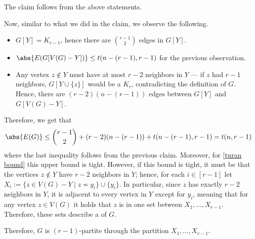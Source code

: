 \documentclass[a4paper, 12pt]{report}
\begin{document}
{{            The claim follows from the above statements.
        }

        Now, similar to what we did in the claim, we observe the following.

        \begin{itemize}
            \item $G[Y] = K_{r - 1}$, hence there are $\binom{r - 1}{2}$ edges in $G[Y]$.
            \item $\abs{E(G[V(G) - Y])} \le t(n - (r - 1), r - 1)$ for the previous observation.
            \item Any vertex $z \notin Y$ must have at most $r - 2$ neighbors in $Y$ --- if $z$ had $r - 1$ neighbors, $G[Y \cup \{z\}]$ would be a $K_r$, contradicting the definition of $G$. Hence, there are $(r - 2)(n - (r - 1))$ edges between $G[Y]$ and $G[V(G) - Y]$.
        \end{itemize}

        Therefore, we get that $$\abs{E(G)} \le \binom{ r- 1}{2} + (r - 2)(n - (r - 1)) + t(n - (r - 1), r - 1) = t(n , r - 1)$$ where the last inequality follows from the previous claim. Moreover, for \cref{turan bound} this upper bound is tight. However, if this bound is tight, it must be that the vertices $z \notin Y$ have  $r - 2$ neighbors in $Y$; hence, for each $i \in [r - 1]$ let $X_i := \{z \in V(G) - Y \mid z \nsim y_i\} \cup \{y_i\}$. In particular, since $z$ has exactly $r - 2$ neighbors in $Y$, it is adjacent to every vertex in $Y$ except for $y_i$, meaning that for any vertex $z \in V(G)$ it holds that $z$ is in  one set between $X_1, \ldots, X_{r - 1}$. Therefore, these sets describe a  of $G$.


        Therefore, $G$ is $(r - 1)$-partite through the partition $X_1, \ldots, X_{r - 1}$.
        
}
\end{document}
